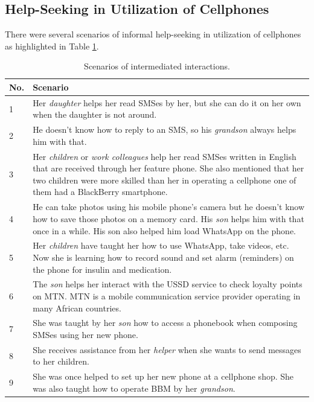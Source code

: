 \subsection{Help-Seeking in Utilization of Cellphones}
There were several scenarios of informal help-seeking in utilization of cellphones as highlighted in Table \ref{table:intermediated}.

\begin{table}[h!]
  \begin{center}
    \caption{Scenarios of intermediated interactions.}
    \label{table:intermediated}
	\begin{tabular}{|p{0.5cm}|p{13cm}|}
		\hline
		 \textbf{No.}&\textbf{Scenario}\\
		\hline
		 1& Her \emph{daughter} helps her read SMSes by her, but she can do it on her own when the daughter is not around. \\
		\hline
		2&He doesn’t know how to reply to an SMS, so his \emph{grandson} always helps him with that.\\
	\hline
	  3&Her \emph{children} or  \emph{work colleagues} help her read SMSes written in English that are received through her feature phone. She also mentioned that her two children were more skilled than her in operating a cellphone one of them had a BlackBerry smartphone.\\
	  \hline
	  4&He can take photos using his mobile phone’s camera but he doesn't know how to save those photos on a memory card. His \emph{son} helps him with that once in a while. His son also helped him load WhatsApp on the phone.\\
	  \hline
	  5&Her \emph{children} have taught her how to use WhatsApp, take videos, etc. Now she is learning how to record sound and set alarm (reminders) on the phone for insulin and medication.\\
	 \hline
	 6&The \emph{son} helps her interact with the USSD service to check loyalty points on MTN. MTN is a mobile communication service provider operating in many African countries.\\
	 \hline
	7&She was taught by  her \emph{son} how to access a phonebook when composing SMSes using her new phone.\\
	\hline
	8&She receives assistance from her \emph{helper} when she wants to send messages to her children.\\
	\hline
	9&She was once helped to set up her new phone at a cellphone shop. She was also taught how to operate BBM by her \emph{grandson}.\\

\end{tabular}
\end{center}
\end{table}
